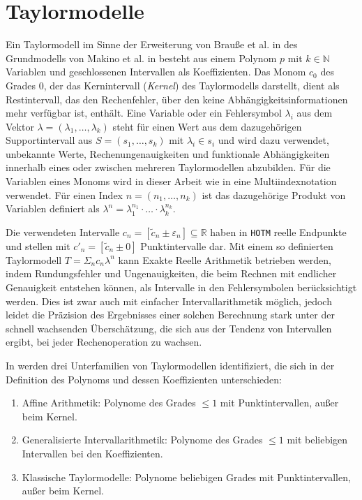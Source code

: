 
\section{Taylormodelle}
Ein Taylormodell im Sinne der Erweiterung von Brauße et al. in \cite{DBLP:conf/macis/BrausseKM15} des Grundmodells von Makino et al. in \cite{makino2001} besteht aus einem Polynom $p$ mit $k\in \mathbb{N}$ Variablen und geschlossenen Intervallen als Koeffizienten. Das Monom $c_0$ des Grades 0, der das Kernintervall (\textit{Kernel}) des Taylormodells darstellt, dient als Restintervall, das den Rechenfehler, über den keine Abhängigkeitsinformationen mehr verfügbar ist, enthält. Eine Variable oder ein Fehlersymbol $\lambda_i$ aus dem Vektor $\lambda = (\lambda_1, \dots, \lambda_k)$ steht für einen Wert aus dem dazugehörigen Supportintervall aus $S=(s_1, \dots, s_k)$ mit $\lambda_i \in s_i$ und wird dazu verwendet, unbekannte Werte, Rechenungenauigkeiten und funktionale Abhängigkeiten innerhalb eines oder zwischen mehreren Taylormodellen abzubilden. Für die Variablen eines Monoms wird in dieser Arbeit wie in \cite{DBLP:conf/macis/BrausseKM15} eine Multiindexnotation verwendet. Für einen Index $n=(n_1,\dots,n_k)$ ist das dazugehörige Produkt von Variablen definiert als $\lambda^n=\lambda_1^{n_1} \cdot \ldots \cdot \lambda_k^{n_k} $.  


Die verwendeten Intervalle $c_n = [\tilde{c}_n \pm \varepsilon_n] \subseteq \mathbb{R}$ haben in \verb+HOTM+ reelle Endpunkte und stellen mit $c'_n = [\tilde{c}_n \pm 0]$ Punktintervalle dar. Mit einem so definierten Taylormodell $T=\Sigma_n c_n \lambda^n$ kann Exakte Reelle Arithmetik betrieben werden, indem Rundungsfehler und Ungenauigkeiten, die beim Rechnen mit endlicher Genauigkeit entstehen können, als Intervalle in den Fehlersymbolen berücksichtigt werden. Dies ist zwar auch mit einfacher Intervallarithmetik möglich, jedoch leidet die Präzision des Ergebnisses einer solchen Berechnung stark unter der schnell wachsenden Überschätzung, die sich aus der Tendenz von Intervallen ergibt, bei jeder Rechenoperation zu wachsen.


In \cite{DBLP:conf/macis/BrausseKM15} werden drei Unterfamilien von Taylormodellen identifiziert, die sich in der Definition des Polynoms und dessen Koeffizienten unterschieden:
\begin{enumerate}
 \item Affine Arithmetik: Polynome des Grades $\leq 1$ mit Punktintervallen, außer beim Kernel.
 \item Generalisierte Intervallarithmetik: Polynome des Grades $\leq 1$ mit beliebigen Intervallen bei den Koeffizienten. \label{tm2}
 \item Klassische Taylormodelle: Polynome beliebigen Grades mit Punktintervallen, außer beim Kernel. \label{tm3}
\end{enumerate}

